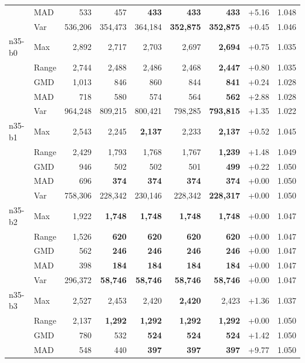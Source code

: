 \begin{small}
\begin{longtable}{llrrrrrrr}
 & MAD & 533 & 457 & \textbf{433} & \textbf{433} & \textbf{433} & +5.16 & 1.048 \\
 & Var & 536,206 & 354,473 & 364,184 & \textbf{352,875} & \textbf{352,875} & +0.45 & 1.046 \\
n35-b0 & Max & 2,892 & 2,717 & 2,703 & 2,697 & \textbf{2,694} & +0.75 & 1.035 \\
 & Range & 2,744 & 2,488 & 2,486 & 2,468 & \textbf{2,447} & +0.80 & 1.035 \\
 & GMD & 1,013 & 846 & 860 & 844 & \textbf{841} & +0.24 & 1.028 \\
 & MAD & 718 & 580 & 574 & 564 & \textbf{562} & +2.88 & 1.028 \\
 & Var & 964,248 & 809,215 & 800,421 & 798,285 & \textbf{793,815} & +1.35 & 1.022 \\
n35-b1 & Max & 2,543 & 2,245 & \textbf{2,137} & 2,233 & \textbf{2,137} & +0.52 & 1.045 \\
 & Range & 2,429 & 1,793 & 1,768 & 1,767 & \textbf{1,239} & +1.48 & 1.049 \\
 & GMD & 946 & 502 & 502 & 501 & \textbf{499} & +0.22 & 1.050 \\
 & MAD & 696 & \textbf{374} & \textbf{374} & \textbf{374} & \textbf{374} & +0.00 & 1.050 \\
 & Var & 758,306 & 228,342 & 230,146 & 228,342 & \textbf{228,317} & +0.00 & 1.050 \\
n35-b2 & Max & 1,922 & \textbf{1,748} & \textbf{1,748} & \textbf{1,748} & \textbf{1,748} & +0.00 & 1.047 \\
 & Range & 1,526 & \textbf{620} & \textbf{620} & \textbf{620} & \textbf{620} & +0.00 & 1.047 \\
 & GMD & 562 & \textbf{246} & \textbf{246} & \textbf{246} & \textbf{246} & +0.00 & 1.047 \\
 & MAD & 398 & \textbf{184} & \textbf{184} & \textbf{184} & \textbf{184} & +0.00 & 1.047 \\
 & Var & 296,372 & \textbf{58,746} & \textbf{58,746} & \textbf{58,746} & \textbf{58,746} & +0.00 & 1.047 \\
n35-b3 & Max & 2,527 & 2,453 & 2,420 & \textbf{2,420} & 2,423 & +1.36 & 1.037 \\
 & Range & 2,137 & \textbf{1,292} & \textbf{1,292} & \textbf{1,292} & \textbf{1,292} & +0.00 & 1.050 \\
 & GMD & 780 & 532 & \textbf{524} & \textbf{524} & \textbf{524} & +1.42 & 1.050 \\
 & MAD & 548 & 440 & \textbf{397} & \textbf{397} & \textbf{397} & +9.77 & 1.050 \\

\end{longtable}
\end{small}
